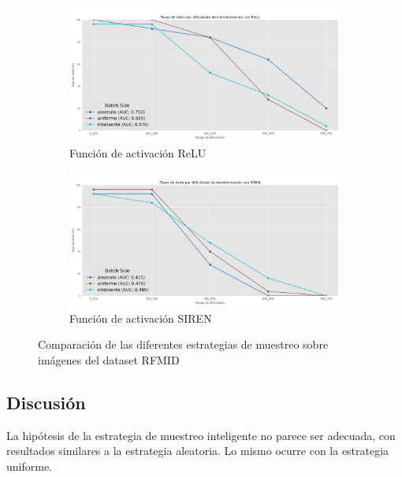 \begin{figure}[tbp]
    \centering
    \begin{subfigure}[b]{0.48\textwidth}
        \centering
        \includegraphics[width=\textwidth]{imaxes/muestraje/experiment_plot_RFMID_st_relu.png}
        \caption{Función de activación ReLU}
        \label{fig:sampling_types_relu}
    \end{subfigure}\hfill
    \begin{subfigure}[b]{0.48\textwidth}
        \centering
        \includegraphics[width=\textwidth]{imaxes/muestraje/experiment_plot_RFMID_st_SIREN.png}
        \caption{Función de activación SIREN}
        \label{fig:sampling_types_siren}
    \end{subfigure}
    \caption{Comparación de las diferentes estrategias de muestreo sobre imágenes del dataset RFMID}
    \label{fig:sampling_types_comparisons}
\end{figure}

\subsection{Discusión}
\label{subsec:Discusion-sampling}

La hipótesis de la estrategia de muestreo inteligente no parece ser adecuada, con resultados similares a la estrategia aleatoria. 
Lo mismo ocurre con la estrategia uniforme.

